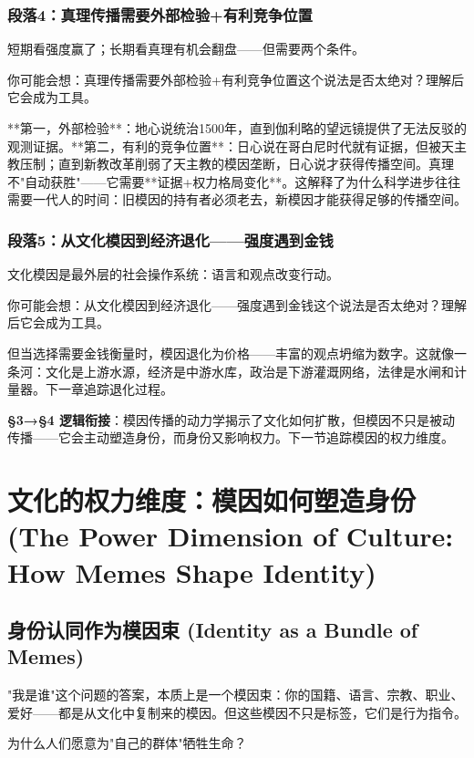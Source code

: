 \documentclass[openany, a4paper, 12pt]{book}
\newenvironment{motivation}{
	\vspace{0.5em}
	\begin{tcolorbox}[
		colback=gray!10,           %
		colframe=gray!60,          %
		title=\textit{本章动机 (Motivation)},
		fonttitle=\bfseries,
		arc=0mm,                   %
		leftrule=3mm               %
		]
		\small \itshape %
	}{
	\end{tcolorbox}
	\vspace{1em}
}
\begin{document}
\begin{motivation}
\begin{motivation}
\begin{motivation}
	\subsubsection*{段落4：真理传播需要外部检验+有利竞争位置}
	短期看强度赢了；长期看真理有机会翻盘——但需要两个条件。
	\begin{tcolorbox}[colback=yellow!5, title=\textit{读者行为预测}]
		你可能会想：真理传播需要外部检验+有利竞争位置这个说法是否太绝对？理解后它会成为工具。
	\end{tcolorbox}

**第一，外部检验**：地心说统治1500年，直到伽利略的望远镜提供了无法反驳的观测证据。**第二，有利的竞争位置**：日心说在哥白尼时代就有证据，但被天主教压制；直到新教改革削弱了天主教的模因垄断，日心说才获得传播空间。真理不"自动获胜"——它需要**证据+权力格局变化**。这解释了为什么科学进步往往需要一代人的时间：旧模因的持有者必须老去，新模因才能获得足够的传播空间。

	\subsubsection*{段落5：从文化模因到经济退化——强度遇到金钱}
	文化模因是最外层的社会操作系统：语言和观点改变行动。
	\begin{tcolorbox}[colback=yellow!5, title=\textit{读者行为预测}]
		你可能会想：从文化模因到经济退化——强度遇到金钱这个说法是否太绝对？理解后它会成为工具。
	\end{tcolorbox}

但当选择需要金钱衡量时，模因退化为价格——丰富的观点坍缩为数字。这就像一条河：文化是上游水源，经济是中游水库，政治是下游灌溉网络，法律是水闸和计量器。下一章追踪退化过程。

	\textbf{§3→§4 逻辑衔接}：模因传播的动力学揭示了文化如何扩散，但模因不只是被动传播——它会主动塑造身份，而身份又影响权力。下一节追踪模因的权力维度。


	
	\section{文化的权力维度：模因如何塑造身份 (The Power Dimension of Culture: How Memes Shape Identity)}

	\subsection{身份认同作为模因束 (Identity as a Bundle of Memes)}
	\begin{motivation}
		"我是谁"这个问题的答案，本质上是一个模因束：你的国籍、语言、宗教、职业、爱好——都是从文化中复制来的模因。但这些模因不只是标签，它们是行为指令。
	\end{motivation}
	\begin{questionbox}
		为什么人们愿意为"自己的群体"牺牲生命？
	\end{questionbox}


\end{motivation}
\end{motivation}
\end{motivation}
\end{document}
